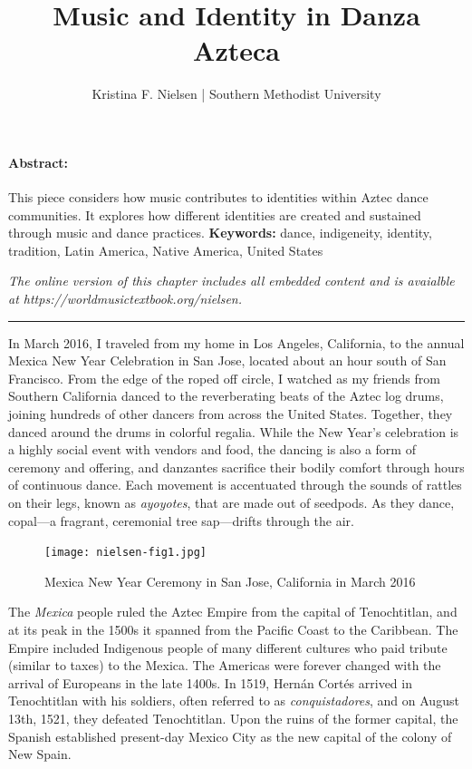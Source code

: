 \documentclass[twoside]{article}
\title{Music and Identity in Danza Azteca}
\author{Kristina F. Nielsen | Southern Methodist University}
\date{}
\makeatletter
\renewcommand{\maketitle}{\bgroup\setlength{\parindent}{0pt}
\begin{flushleft}
  \vspace*{3\baselineskip}
  \huge{\textbf{\@title}}

  \medskip
  
  \large{\@author}
\end{flushleft}\egroup
}
\providecommand{\keywords}[1]
{
  \newline
  \textbf{Keywords:} #1
}
\providecommand{\wmturl}{https://worldmusictextbook.org/nielsen}
\providecommand{\wmturltext}{
  \noindent\emph{The online version of this chapter includes all embedded content and is avaialble at \wmturl.}
}
\makeatother
\begin{document}
\suppressfloats %
\maketitle

\paragraph{Abstract:}
  This piece considers how music contributes to identities within Aztec dance communities. It explores how different identities are created and sustained through music and dance practices.\keywords{dance, indigeneity, identity, tradition, Latin America, Native America, United States}

\smallskip

\wmturltext

\medskip

\noindent\hfil\rule{0.5\textwidth}{0.4pt}\hfil

\bigskip

In March 2016, I traveled from my home in Los Angeles, California, to
the annual Mexica New Year Celebration in San Jose, located about an
hour south of San Francisco. From the edge of the roped off circle, I
watched as my friends from Southern California danced to the
reverberating beats of the Aztec log drums, joining hundreds of other
dancers from across the United States. Together, they danced around the
drums in colorful regalia. While the New Year's celebration is a highly
social event with vendors and food, the dancing is also a form of
ceremony and offering, and danzantes sacrifice their bodily comfort
through hours of continuous dance. Each movement is accentuated through
the sounds of rattles on their legs, known as \emph{ayoyotes}, that are
made out of seedpods. As they dance, copal---a fragrant, ceremonial tree
sap---drifts through the air.

\begin{figure}
  \texttt{[image: nielsen-fig1.jpg]}
  \caption{Mexica New Year Ceremony in San Jose, California in March 2016}
\end{figure}

The \emph{Mexica} people ruled the Aztec Empire from the capital of
Tenochtitlan, and at its peak in the 1500s it spanned from the Pacific
Coast to the Caribbean. The Empire included Indigenous people of many
different cultures who paid tribute (similar to taxes) to the Mexica.
The Americas were forever changed with the arrival of Europeans in the
late 1400s. In 1519, Hernán Cortés arrived in Tenochtitlan with his
soldiers, often referred to as \emph{conquistadores}, and on August
13th, 1521, they defeated Tenochtitlan. Upon the ruins of the former
capital, the Spanish established present-day Mexico City as the new
capital of the colony of New Spain.
\end{document}
